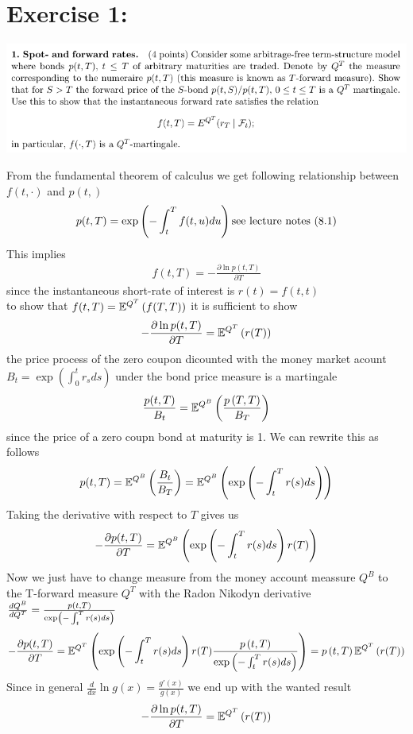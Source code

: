 \documentclass[document.tex]{subfiles}
\begin{document}
\section*{Exercise 1:}

\includegraphics[width=\textwidth]{ex1.png}

From the fundamental theorem of calculus we get following relationship between $f(t,\cdot)$ and $p(t, )$ \\
\begin{align*}
	p(t,T) = \exp \left( - \int^T_t f (t,u) du \right) \text{see lecture notes (8.1)}
\end{align*}
This implies 
\begin{align*}
	f(t,T) = - \frac{\partial \ln p (t,T) }{\partial T}
\end{align*}
since the instantaneous short-rate of interest is $r(t) = f(t,t)$\\
to show that $f(t,T) = \mathbb{E}^{Q^T} \left( f(T,T) \right) $ it is sufficient to show
\begin{align*}
	- \frac{\partial \ln p (t,T) }{\partial T} = \mathbb{E}^{Q^T} \left( r(T) \right) 
\end{align*}
the price process of the zero coupon dicounted with the money market acount $B_t = \exp(\int_0^t r_s ds)$
under the bond price measure is a martingale
\begin{align*}
	\frac{p(t,T)}{B_t} = \mathbb{E}^{Q^B} \left(  \frac{p\left( T,T\right)}{B_T} \right)
\end{align*}
since the price of a zero coupn bond at maturity is 1. We can rewrite this as follows 
\begin{align*}
	p(t,T) = \mathbb{E}^{Q^B} \left(  \frac{B_t}{B_T} \right) = \mathbb{E}^{Q^B} \left(  \exp \left( - \int_t^T r(s) ds \right) \right) 
\end{align*}
Taking the derivative with respect to $T$ gives us	
\begin{align*}
	- \frac{\partial p (t,T) }{\partial T} = \mathbb{E}^{Q^B} \left(  \exp \left( - \int_t^T r(s) ds \right) r(T) \right)   
\end{align*}
Now we just have to change measure from the money account meassure $Q^B$ to the T-forward measure $Q^T$  
with the Radon Nikodyn derivative  $\frac{d Q^B}{dQ^T} = \frac{p\left( t,T \right)}{\exp \left( - \int_t^T r(s) ds \right) }$
\begin{align*}
	- \frac{\partial p(t,T)}{\partial T} = \mathbb{E}^{Q^T} \left(  \exp \left( - \int_t^T r(s) ds \right) r(T)  
	\frac{p\left( t,T \right)}{\exp \left( - \int_t^T r(s) ds \right) } \right) 
	  = p \left( t,T \right)  \mathbb{E}^{Q^T} \left( r(T)  \right) 
\end{align*}
Since in general $\frac{d}{dx} \ln g(x) = \frac{g'(x)}{g(x)}$
we end up with the wanted result 
\begin{align*}
	- \frac{\partial \ln p (t,T) }{\partial T} = \mathbb{E}^{Q^T} \left( r(T) \right) 
\end{align*}
\end{document}
